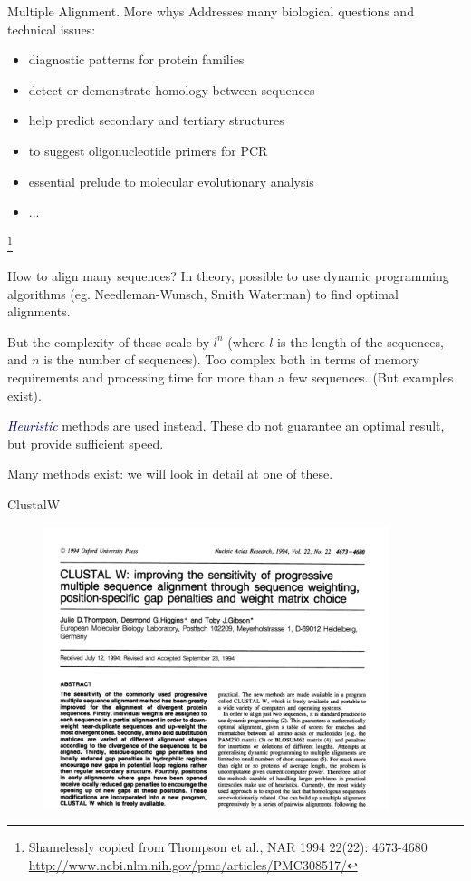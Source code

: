 \documentclass[pdf]{beamer}
\newcommand\blfootnote[1]{%
  \begingroup  %
  \renewcommand\thefootnote{}\footnote{#1}%
  \addtocounter{footnote}{-1}  %
  \endgroup
}
\begin{document}
\begin{frame}{Multiple Alignment. More whys}
  Addresses many biological questions and technical issues:
  \begin{itemize}
  \item diagnostic patterns for protein families
  \item detect or demonstrate homology between sequences
  \item help predict secondary and tertiary structures
  \item to suggest oligonucleotide primers for PCR
  \item essential prelude to molecular evolutionary analysis
  \item ...
  \end{itemize}
  \blfootnote{Shamelessly copied from Thompson et al., NAR 1994 22(22): 4673-4680\\
    \url{http://www.ncbi.nlm.nih.gov/pmc/articles/PMC308517/}
  }
\end{frame}

\begin{frame}{How to align many sequences?}
  In theory, possible to use dynamic programming algorithms (eg. Needleman-Wunsch,
  Smith Waterman) to find optimal alignments.

  But the complexity of these scale by $l^n$ (where $l$ is the length of the sequences,
  and $n$ is the number of sequences). Too complex both in terms of memory
  requirements and 
  processing time for more than a few sequences. (But examples exist).

  \textcolor{navy}{\emph{Heuristic}} methods are used instead. These do not guarantee an
  optimal result, but provide sufficient speed.

  Many methods exist: we will look in detail at one of these.
\end{frame}

\begin{frame}{ClustalW}
  \begin{figure}[ht]
    \includegraphics[width=0.9\textwidth]{images/clustalw_title}
  \end{figure}
\end{frame}
\end{document}
